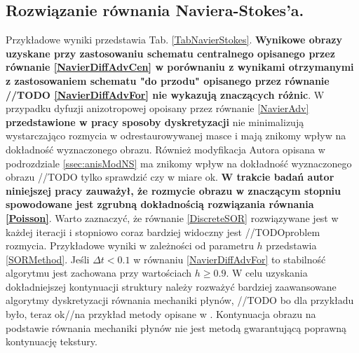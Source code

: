 \documentclass[12pt, twoside, openany]{report}
\theoremstyle{definition}
\begin{document}
\subsection{Rozwiązanie równania Naviera-Stokes'a.}
Przykładowe wyniki  przedstawia Tab. \ref{TabNavierStokes}. \textbf{Wynikowe obrazy uzyskane przy zastosowaniu schematu centralnego opisanego przez równanie \eqref{NavierDiffAdvCen} w porównaniu z wynikami otrzymanymi z zastosowaniem schematu "do przodu" opisanego przez równanie //TODO \eqref{NavierDiffAdvFor} nie wykazują znaczących różnic}. W przypadku dyfuzji anizotropowej opoisany przez równanie \eqref{NavierAdv}  \textbf{przedstawione w pracy sposoby dyskretyzacji} nie minimalizują wystarczająco rozmycia w odrestaurowywanej masce i mają znikomy wpływ na dokładność wyznaczonego obrazu. Również modyfikacja Autora opisana w podrozdziale \ref{ssec:anisModNS} ma znikomy wpływ na dokładność wyznaczonego obrazu //TODO tylko sprawdzić czy w miare ok. \textbf{W trakcie badań autor niniejszej pracy zauważył, że rozmycie obrazu w znaczącym stopniu spowodowane jest zgrubną dokładnością rozwiązania równania \eqref{Poisson}}. Warto zaznaczyć, że równanie \eqref{DiscreteSOR} rozwiązywane jest w każdej iteracji i stopniowo coraz bardziej widoczny jest //TODOproblem rozmycia. Przykładowe wyniki w zależności od parametru $h$  przedstawia \autoref{SORMethod}. Jeśli $\Delta t <0.1$ w równaniu \eqref{NavierDiffAdvFor} to stabilność algorytmu jest zachowana przy wartościach $h \geq 0.9$. W celu uzyskania dokładniejszej kontynuacji struktury należy rozważyć bardziej zaawansowane algorytmy dyskretyzacji równania mechaniki płynów, //TODO bo dla przykładu było, teraz ok//na przykład metody opisane w \cite{tschumperle2006fast}. Kontynuacja obrazu na podstawie równania mechaniki płynów nie jest metodą gwarantującą poprawną kontynuację tekstury. 
\end{document}
